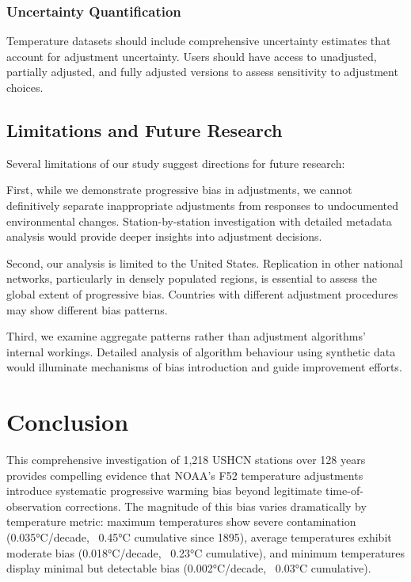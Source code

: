 \documentclass[11pt, a4paper]{article}
\begin{document}
\subsubsection{Uncertainty Quantification}
Temperature datasets should include comprehensive uncertainty estimates that account for adjustment uncertainty. Users should have access to unadjusted, partially adjusted, and fully adjusted versions to assess sensitivity to adjustment choices.

\subsection{Limitations and Future Research}

Several limitations of our study suggest directions for future research:

First, while we demonstrate progressive bias in adjustments, we cannot definitively separate inappropriate adjustments from responses to undocumented environmental changes. Station-by-station investigation with detailed metadata analysis would provide deeper insights into adjustment decisions.

Second, our analysis is limited to the United States. Replication in other national networks, particularly in densely populated regions, is essential to assess the global extent of progressive bias. Countries with different adjustment procedures may show different bias patterns.

Third, we examine aggregate patterns rather than adjustment algorithms' internal workings. Detailed analysis of algorithm behaviour using synthetic data would illuminate mechanisms of bias introduction and guide improvement efforts.

\section{Conclusion}

This comprehensive investigation of 1,218 USHCN stations over 128 years provides compelling evidence that NOAA's F52 temperature adjustments introduce systematic progressive warming bias beyond legitimate time-of-observation corrections. The magnitude of this bias varies dramatically by temperature metric: maximum temperatures show severe contamination (0.035°C/decade, ~0.45°C cumulative since 1895), average temperatures exhibit moderate bias (0.018°C/decade, ~0.23°C cumulative), and minimum temperatures display minimal but detectable bias (0.002°C/decade, ~0.03°C cumulative).
\end{document}

